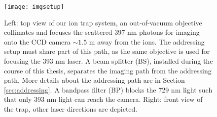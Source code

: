 \begin{figure}
\centering
\texttt{[image: imgsetup]}
\caption[Caption for LOF]{Left: top view of our ion trap system, an out-of-vacuum objective collimates and focuses the scattered 397 nm photons for imaging onto the CCD camera $\sim 1.5$ m away from the ions. The addressing setup must share part of this path, as the same objective is used for focusing the 393 nm laser.
A beam splitter (BS), installed during the course of this thesis, separates the imaging path from the addressing path. More details about the addressing path are in Section \ref{sec:addressing}.
A bandpass filter (BP) blocks the 729 nm light such that only 393 nm light can reach the camera. Right: front view of the trap, other laser directions are depicted.}
\label{imgsetup}
\end{figure}

